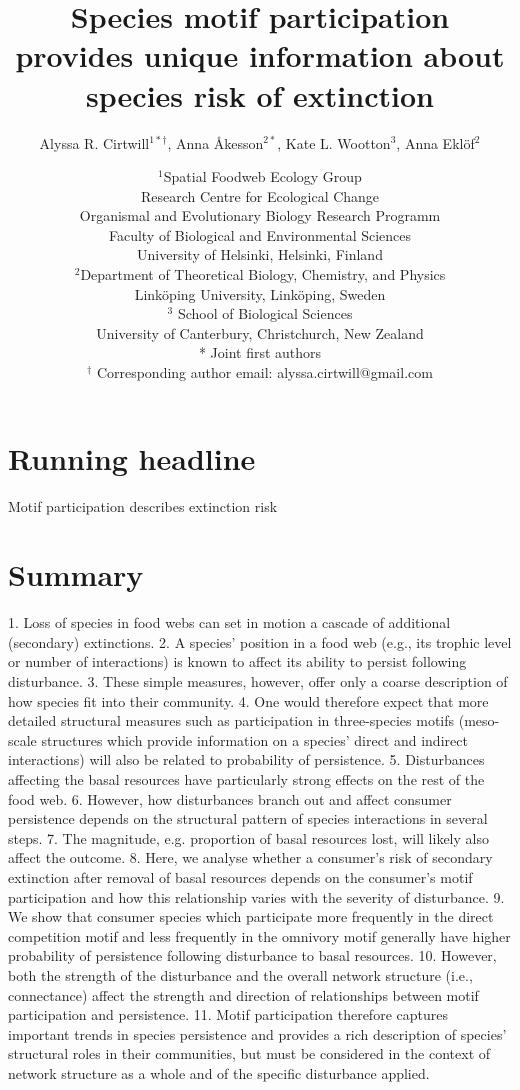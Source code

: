 \documentclass[12pt]{article}
\title{Species motif participation provides unique information about species risk of extinction}
\author{Alyssa R. Cirtwill$^{1*\dagger}$, Anna \r{A}kesson$^{2*}$, Kate L. Wootton$^{3}$, Anna Ekl\"{o}f$^{2}$}
\date{
\small$^1$Spatial Foodweb Ecology Group\\
Research Centre for Ecological Change\\
Organismal and Evolutionary Biology Research Programm\\
Faculty of Biological and Environmental Sciences\\
University of Helsinki, Helsinki, Finland\\
\medskip
\small$^2$Department of Theoretical Biology, Chemistry, and Physics\\ 
Link\"{o}ping University, Link\"{o}ping, Sweden\\
\medskip
\small$^3$ School of Biological Sciences\\
University of Canterbury, Christchurch, New Zealand\\
\medskip
* Joint first authors\\
\medskip
$^\dagger$ Corresponding author email: alyssa.cirtwill@gmail.com\\
}
\begin{document}
 
\raggedright

\setlength{\parindent}{15pt} 

\section*{Running headline}
Motif participation describes extinction risk

\clearpage

\section*{Summary}

    1. Loss of species in food webs can set in motion a cascade of additional (secondary)  extinctions.
    2. A species' position in a food web (e.g., its trophic level or number of interactions) is known to affect its ability to persist following disturbance. 
    3. These simple measures, however, offer only a coarse description of how species fit into their community. 
    4. One would therefore expect that more detailed structural measures such as  participation in three-species motifs (meso-scale structures which provide information on a species' direct and indirect interactions) will also be related to probability of persistence.
    5. Disturbances affecting the basal resources have particularly strong effects on the rest of the food web. 
    6. However, how disturbances branch out and affect consumer persistence depends on the structural pattern of species interactions in several steps. 
    7. The magnitude, e.g. proportion of basal resources lost, will likely also affect the outcome.     
    8. Here, we analyse whether a consumer's risk of secondary extinction after removal of basal resources depends on the consumer's motif participation and how this relationship varies with the severity of disturbance.
    9. We show that consumer species which participate more frequently in the direct competition motif and less frequently in the omnivory motif generally have higher probability of persistence following disturbance to basal resources.
    10. However, both the strength of the disturbance and the overall network structure (i.e., connectance) affect the strength and direction of relationships between motif participation and persistence.
    11. Motif participation therefore captures important trends in species persistence and provides a rich description of species' structural roles in their communities, but must be considered in the context of network structure as a whole and of the specific disturbance applied.
\end{document}
